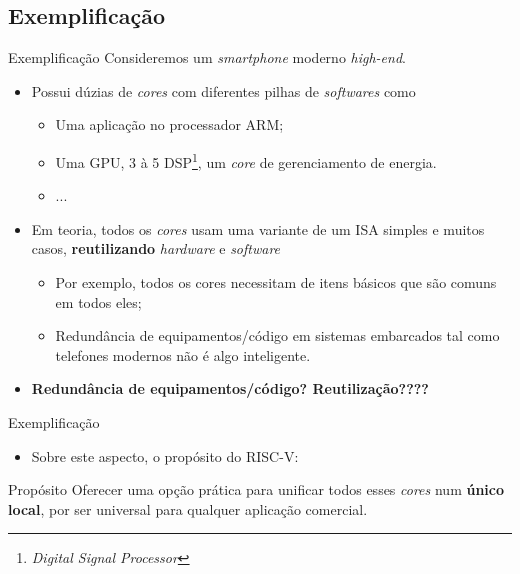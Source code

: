 \documentclass[red, aspectratio=169, xcolor=dvipsnames]{beamer}
\let\olditem=\item%
\renewcommand{\item}{\olditem \justifying}
\begin{document}
\subsection{Exemplificação}
\begin{frame}{Exemplificação}
	Consideremos um \textit{smartphone} moderno \textit{high-end}.
	\begin{itemize}		
		\setlength{\itemsep}{1.2em}
		\item Possui dúzias de \textit{cores} com diferentes pilhas de \textit{softwares} como
		\begin{itemize}
			\item Uma aplicação no processador ARM;
			\item Uma GPU, 3 à 5 DSP\footnote{\textit{Digital Signal Processor}}, um \textit{core} de gerenciamento de energia.
			\item ...
		\end{itemize}
		
		\item Em teoria, todos os \textit{cores} usam uma variante de um ISA simples e muitos casos, \textbf{reutilizando} \textit{hardware} e \textit{software}
		\begin{itemize}
			\item Por exemplo, todos os cores necessitam de itens básicos que são comuns em todos eles;
			\item Redundância de equipamentos/código em sistemas embarcados tal como telefones modernos não é algo inteligente.
		\end{itemize}
	
		\pause
	
		\item \textbf{Redundância de equipamentos/código? Reutilização????}
	
	\end{itemize}
\end{frame}

\begin{frame}{Exemplificação}
	\begin{itemize}		
		\setlength{\itemsep}{1.2em}
		\item Sobre este aspecto, o propósito do RISC-V:
	\end{itemize}
	\begin{block}{Propósito}
		Oferecer uma opção prática para unificar todos esses \textit{cores} num \textbf{único local}, por ser universal para qualquer aplicação comercial.
	\end{block}
\end{frame}
\end{document}

